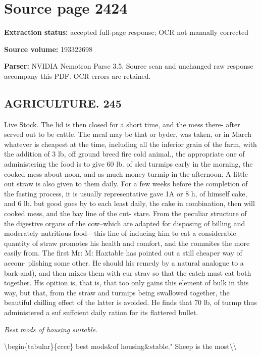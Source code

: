 \clearpage
\section{Source page 2424}
\textbf{Extraction status:} accepted full-page response; OCR not manually corrected\par
\textbf{Source volume:} 193322698\par
\textbf{Parser:} NVIDIA Nemotron Parse 3.5. Source scan and unchanged raw response accompany this PDF. OCR errors are retained.\par\medskip
\subsection*{AGRICULTURE. 245}
Live Stock. The lid is then closed for a short time, and the mess there- after served out to be cattle. The meal may be that or byder, was taken, or in March whatever is cheapest at the time, including all the inferior grain of the farm, with the addition of 3 lb, off ground breed fire cold animal., the appropriate one of administering the food is to give 60 lb. of sled turmips early in the morning, the cooked mess about noon, and as much money turmip in the afternoon. A little out straw is also given to them daily. For a few weeks before the completion of the fasting process, it is usually representative gave 1A or 8 h, of himself cake, and 6 lb. but good goes by to each least daily, the cake in combination, then will cooked mess, and the bay line of the cut- stare. From the peculiar structure of the digestive organs of the cow--which are adapted for disposing of billing and moderately nutritious food—this line of inducing him to eat a considerable quantity of straw promotes his health and comfort, and the commites the more easily from. The first Mr: M: Haxtable has pointed out a still cheaper way of accom- plishing some other. He should his remedy by a natural analogue to a bark-and), and then mixes them with cur strav so that the catch must eat both together. His opition is, that is, that too only gains this element of bulk in this way, but that, from the straw and turmips being swallowed together, the beautiful chilling effect of the latter is avoided. He finds that 70 lb, of turmp thus administered a suf suffcient daily ration for its flattered bullet.\par\medskip
{\small\itshape Best mods of housing suitable.\par}\medskip
\textbackslash{}begin\{tabular\}\{cccc\}
best mods\&of housing\&stable." Sheep is the most\textbackslash{}\textbackslash{}
